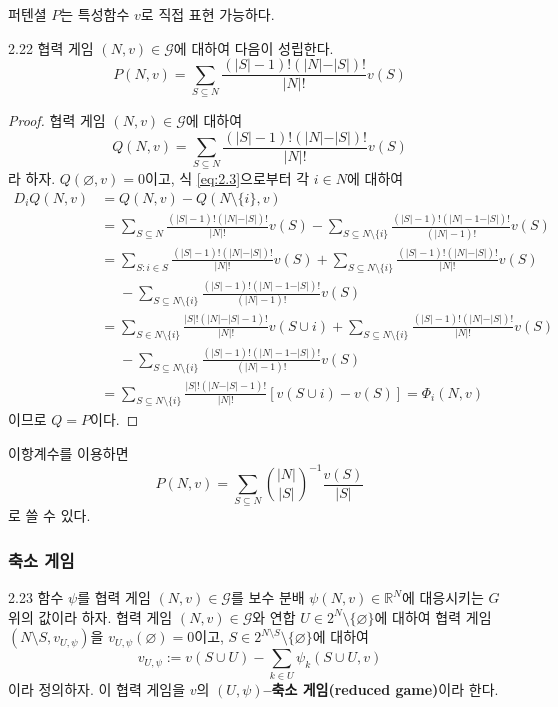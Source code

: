 \documentclass{article}
\numberwithin{equation}{section}
\begin{document}
퍼텐셜 $P$는 특성함수 $v$로 직접 표현 가능하다.

\begin{thm}{}{2.22}
	협력 게임 $(N,v)\in\mathcal G$에 대하여 다음이 성립한다.
	\[
		P(N,v)=\sum_{S\subseteq N}\frac{(\vert S\vert-1)!(\vert N\vert-\vert S\vert)!}{\vert N\vert!}v(S)
	\]
\end{thm}

\begin{proof}
	협력 게임 $(N,v)\in\mathcal G$에 대하여
	\[
		Q(N,v)=\sum_{S\subseteq N}\frac{(\vert S\vert-1)!(\vert N\vert-\vert S\vert)!}{\vert N\vert!}v(S)
	\]
	라 하자. $Q(\varnothing,v)=0$이고, 식 \ref{eq:2.3}으로부터 각 $i\in N$에 대하여
	\[
		\begin{aligned}
			D_iQ(N,v)&=Q(N,v)-Q(N\setminus\{i\},v)\\[3pt]
			&=\sum_{S\subseteq N}\frac{(\vert S\vert-1)!(\vert N\vert-\vert S\vert)!}{\vert N\vert!}v(S)-\sum_{S\subseteq N\setminus\{i\}}\frac{(\vert S\vert-1)!(\vert N\vert-1-\vert S\vert)!}{(\vert N\vert-1)!}v(S)\\[3pt]
			&=\sum_{S:i\in S}\frac{(\vert S\vert-1)!(\vert N\vert-\vert S\vert)!}{\vert N\vert!}v(S)+\sum_{S\subseteq N\setminus\{i\}}\frac{(\vert S\vert-1)!(\vert N\vert-\vert S\vert)!}{\vert N\vert!}v(S)\\
			&\phantom{=}-\sum_{S\subseteq N\setminus\{i\}}\frac{(\vert S\vert-1)!(\vert N\vert-1-\vert S\vert)!}{(\vert N\vert-1)!}v(S)\\[3pt]
			&=\sum_{S\in N\setminus\{i\}}\frac{\vert S\vert!(\vert N\vert-\vert S\vert-1)!}{\vert N\vert!}v(S\cup i)+\sum_{S\subseteq N\setminus\{i\}}\frac{(\vert S\vert-1)!(\vert N\vert-\vert S\vert)!}{\vert N\vert!}v(S)\\
			&\phantom{=}-\sum_{S\subseteq N\setminus\{i\}}\frac{(\vert S\vert-1)!(\vert N\vert-1-\vert S\vert)!}{(\vert N\vert-1)!}v(S)\\[3pt]
			&=\sum_{S\subseteq N\setminus\{i\}}\frac{\vert S\vert!(\vert N-\vert S\vert-1)!}{\vert N\vert!}[v(S\cup i)-v(S)]=\Phi_i(N,v)
		\end{aligned}
	\]
	이므로 $Q=P$이다.
\end{proof}

\begin{remark}
	이항계수를 이용하면
	\[
		P(N,v)=\sum_{S\subseteq N}\binom{\vert N\vert}{\vert S\vert}^{-1}\frac{v(S)}{\vert S\vert}
	\]
	로 쓸 수 있다.
\end{remark}

\subsubsection*{축소 게임}
\begin{dfn}{}{2.23}
	함수 $\psi$를 협력 게임 $(N,v)\in\mathcal G$를 보수 분배 $\psi(N,v)\in\mathbb R^N$에 대응시키는 $G$ 위의 값이라 하자. 협력 게임 $(N,v)\in\mathcal G$와 연합 $U\in 2^N\setminus\{\varnothing\}$에 대하여 협력 게임 $(N\setminus S,v_{U,\psi})$을 $v_{U,\psi}(\varnothing)=0$이고, $S\in 2^{N\setminus S}\setminus\{\varnothing\}$에  대하여
	\[
		v_{U,\psi}:=v(S\cup U)-\sum_{k\in U}\psi_k(S\cup U,v)
	\]
	이라 정의하자. 이 협력 게임을 $v$의 $(U,\psi)$\textbf{--축소 게임(reduced game)}이라 한다.
\end{dfn}
\end{document}
